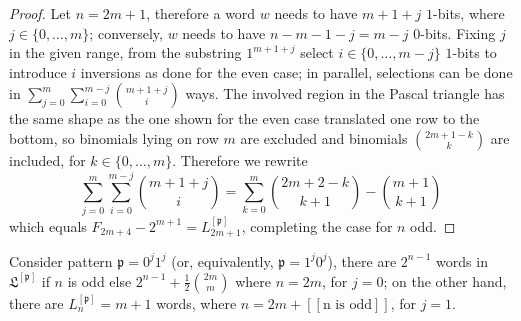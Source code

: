 \begin{proof}
Let $n=2m+1$, therefore a word $w$ needs to have $m+1+j$ $1$-bits, where $j\in
\lbrace 0,\ldots,m \rbrace$; conversely, $w$ needs to have $n-m-1-j=m-j$ $0$-bits.
Fixing $j$ in the given range, from the substring $1^{m+1+j}$ select
$i\in \lbrace 0,\ldots,m-j \rbrace$ $1$-bits  to introduce $i$ inversions as
done for the even case; in parallel, selections can be done in $
\sum_{j=0}^{m}{\sum_{i=0}^{m-j}{ {{m+1+j}\choose{i}}} } $ ways. The involved
region in the Pascal triangle has the same shape as the one shown for the even
case translated one row to the bottom, so binomials lying on row $m$ are
excluded and binomials ${ {2m+1-k}\choose{k} }$ are included, for $k\in \lbrace
0, \ldots, m \rbrace$.  Therefore we rewrite
\begin{displaymath}
    \sum_{j=0}^{m}{\sum_{i=0}^{m-j}{ {{m+1+j}\choose{i}}} }
    = \sum_{k=0}^{m}{{ {2m+2-k}\choose{k+1} }-{ {m+1}\choose{k+1} }}
\end{displaymath}
which equals $F_{2m+4}-2^{m+1} = L_{2m+1}^{[\mathfrak{p}]}$,
completing the case for $n$ odd.
\end{proof}

\begin{corollary}
Consider pattern $\mathfrak{p}=0^{j}1^{j}$ (or, equivalently,
$\mathfrak{p}=1^{j}0^{j}$), there are $2^{n-1}$ words in
$\mathfrak{L}^{[\mathfrak{p}]}$ if $n$ is odd else $2^{n-1}
+\frac{1}{2}{{2m}\choose{m}}$ where $n=2m$, for $j=0$; on the other hand, there
are $L_{n}^{[\mathfrak{p}]} = m+1$ words, where $n=2m +  [\![\text{n is
odd}]\!]$, for $j=1$.
\end{corollary}

